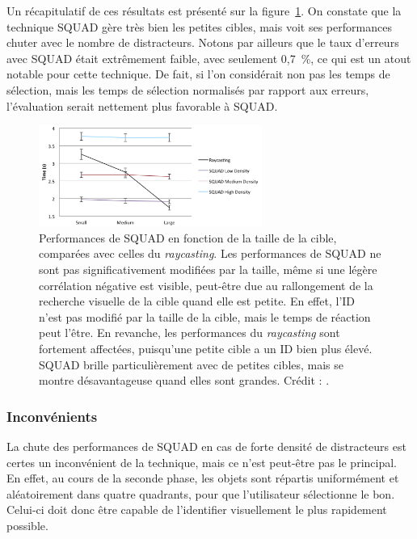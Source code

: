 	Un récapitulatif de ces résultats est présenté sur la figure~\ref{fig:squadRecap}. On constate que la technique SQUAD gère très bien les petites cibles, mais voit ses performances chuter avec le nombre de distracteurs. Notons par ailleurs que le taux d'erreurs avec SQUAD était extrêmement faible, avec seulement 0,7~\%{}, ce qui est un atout notable pour cette technique. De fait, si l'on considérait non pas les temps de sélection, mais les temps de sélection normalisés par rapport aux erreurs, l'évaluation serait nettement plus favorable à SQUAD.
	
	\begin{figure}[!htb]
		\centering
		\includegraphics[width=0.65\textwidth]{figures/ch2/squadRecap}
		\caption[SQUAD -- résultats : taille]{Performances de SQUAD en fonction de la taille de la cible, comparées avec celles du \emph{raycasting}. Les performances de SQUAD ne sont pas significativement modifiées par la taille, même si une légère corrélation négative est visible, peut-être due au rallongement de la recherche visuelle de la cible quand elle est petite. En effet, l'ID n'est pas modifié par la taille de la cible, mais le temps de réaction peut l'être. En revanche, les performances du \emph{raycasting} sont fortement affectées, puisqu'une petite cible a un ID bien plus élevé. SQUAD brille particulièrement avec de petites cibles, mais se montre désavantageuse quand elles sont grandes. Crédit : \cite{kopper2011rapid}.}
		\label{fig:squadRecap}
	\end{figure}
	
	\subsubsection{Inconvénients}
	La chute des performances de SQUAD en cas de forte densité de distracteurs est certes un inconvénient de la technique, mais ce n'est peut-être pas le principal. En effet, au cours de la seconde phase, les objets sont répartis uniformément et aléatoirement dans quatre quadrants, pour que l'utilisateur sélectionne le bon. Celui-ci doit donc être capable de l'identifier visuellement le plus rapidement possible.
	
